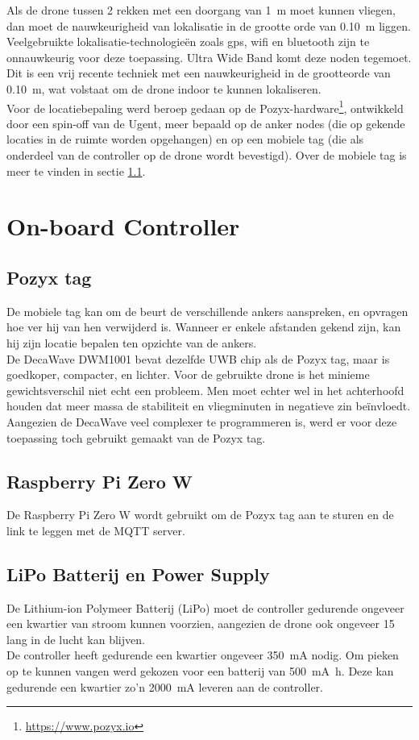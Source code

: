 Als de drone tussen 2 rekken met een doorgang van \SI{1}{\m} moet kunnen vliegen, dan moet de nauwkeurigheid van lokalisatie in de grootte orde van \SI{0.10}{\m} liggen. Veelgebruikte lokalisatie-technologie\"en zoals gps, wifi en bluetooth zijn te onnauwkeurig voor deze toepassing. Ultra Wide Band komt deze noden tegemoet. Dit is een vrij recente techniek met een nauwkeurigheid in de grootteorde van \SI{0.10}{\m}, wat volstaat om de drone indoor te kunnen lokaliseren.\\

Voor de locatiebepaling werd beroep gedaan op de Pozyx-hardware\footnote{\url{https://www.pozyx.io}}, ontwikkeld door een spin-off van de Ugent, meer bepaald op de anker nodes (die op gekende locaties in de ruimte worden opgehangen) en op een mobiele tag (die als onderdeel van de controller op de drone wordt bevestigd). 
Over de mobiele tag is meer te vinden in sectie \ref{sec:pozyx_tag}.

\section{On-board Controller} \label{sec:onboard_controller}
\subsection{Pozyx tag}  \label{sec:pozyx_tag}
De mobiele tag kan om de beurt de verschillende ankers aanspreken, en opvragen hoe ver hij van hen verwijderd is. Wanneer er enkele afstanden gekend zijn, kan hij zijn locatie bepalen ten opzichte van de ankers.\\

De DecaWave DWM1001 bevat dezelfde UWB chip als de Pozyx tag, maar is goedkoper, compacter, en lichter. Voor de gebruikte drone is het minieme gewichtsverschil niet echt een probleem. Men moet echter wel in het achterhoofd houden dat meer massa de stabiliteit en vliegminuten in negatieve zin be\"invloedt.\\
Aangezien de DecaWave veel complexer te programmeren is, werd er voor deze toepassing toch gebruikt gemaakt van de Pozyx tag.

\subsection{Raspberry Pi Zero W} \label{sec:raspberry_pi}
De Raspberry Pi Zero W wordt gebruikt om de Pozyx tag aan te sturen en de link te leggen met de MQTT server.

\subsection{LiPo Batterij en Power Supply} \label{sec:lipo}
De Lithium-ion Polymeer Batterij (LiPo) moet de controller gedurende ongeveer een kwartier van stroom kunnen voorzien, aangezien de drone ook ongeveer \SI{15}{\min} lang in de lucht kan blijven.\\
De controller heeft gedurende een kwartier ongeveer \SI{350}{\mA} nodig. Om pieken op te kunnen vangen werd gekozen voor een batterij van \SI{500}{\mA\hour}. Deze kan gedurende een kwartier zo'n \SI{2000}{\mA} leveren aan de controller.\\

